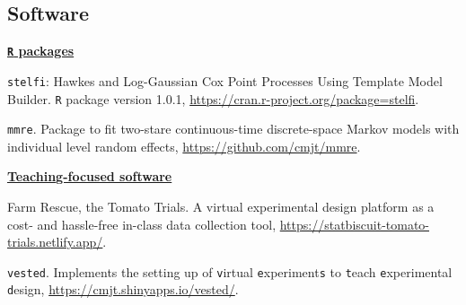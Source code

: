 \documentclass[10pt,a4paper]{moderncv}
\begin{document}
\vspace{2pt}

\subsection{Software}


\underline{\textbf{\texttt{R} packages}}\\
\vspace{-3pt}

\texttt{stelfi}: Hawkes and Log-Gaussian Cox Point Processes Using Template Model Builder. \texttt{R} package version 1.0.1, \url{https://cran.r-project.org/package=stelfi}.\\

\vspace{-3pt}

\texttt{mmre}. Package to fit two-stare continuous-time discrete-space Markov models with individual level random effects, \url{https://github.com/cmjt/mmre}.\\






\vspace{2pt}

\underline{\textbf{Teaching-focused software}}\\
\vspace{-3pt}

Farm Rescue, the Tomato Trials. A virtual experimental design platform as a cost- and hassle-free in-class data collection tool, \url{https://statbiscuit-tomato-trials.netlify.app/}.\\

\vspace{-3pt}

\texttt{vested}. Implements the setting up of \texttt{v}irtual \texttt{e}xperiment\texttt{s} to \texttt{t}each \texttt{e}xperimental \texttt{d}esign, \url{https://cmjt.shinyapps.io/vested/}.\\

\vspace{2pt}
\end{document}
